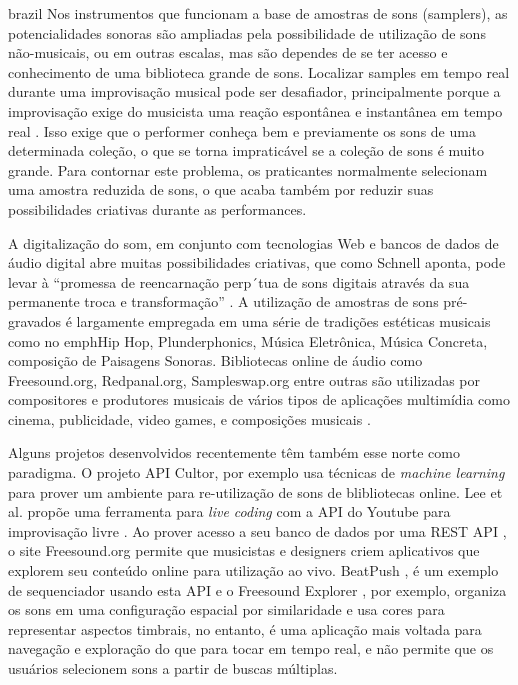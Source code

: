 \begin{otherlanguage*}{brazil}
Nos instrumentos que funcionam a base de amostras de sons (samplers), as potencialidades sonoras são ampliadas pela possibilidade de utilização de sons não-musicais, ou em outras escalas, mas são dependes de se ter acesso e conhecimento de uma biblioteca grande de sons. Localizar samples em tempo real durante uma improvisação musical pode ser desafiador\cite{Xambo2018}, principalmente porque a improvisação exige do musicista uma reação espontânea e instantânea em tempo real \cite{canonne2011model}. Isso exige que o performer conheça bem e previamente os sons de uma determinada coleção, o que se torna impraticável se a coleção de sons é muito grande. Para contornar este problema, os praticantes normalmente selecionam uma amostra reduzida de sons, o que acaba também por reduzir suas possibilidades criativas durante as performances.

A digitalização do som, em conjunto com tecnologias Web e bancos de dados de áudio digital abre muitas possibilidades criativas, que como Schnell aponta, pode levar à ``promessa de reencarnação perp´tua de sons digitais através da sua permanente troca e transformação'' \cite{Schnell2013}. A utilização de amostras de sons pré-gravados é largamente empregada em uma série de tradições estéticas musicais como no emph{Hip Hop, Plunderphonics, Música Eletrônica, Música Concreta, composição de Paisagens Sonoras}. Bibliotecas online de áudio como Freesound.org, Redpanal.org, Sampleswap.org entre outras são utilizadas por compositores e produtores musicais de vários tipos de aplicações multimídia como cinema, publicidade, video games, e composições musicais \cite{Roma2013}. 

Alguns projetos desenvolvidos recentemente têm também esse norte como paradigma. O projeto API Cultor, por exemplo \cite{Ordiales2017} usa técnicas de \emph{machine learning} para prover um ambiente para re-utilização de sons de blibliotecas online. Lee et al. propõe uma ferramenta para \emph{live coding} com a API do Youtube para improvisação livre \cite{Lee}. Ao prover acesso a seu banco de dados por uma REST API \cite{Akkermans2011}, o site Freesound.org permite que musicistas e designers criem aplicativos que explorem seu conteúdo online para utilização ao vivo. BeatPush \cite{Feenstra2016}, é um exemplo de sequenciador usando esta API e o Freesound Explorer \cite{Font2016}, por exemplo, organiza os sons em uma configuração espacial por similaridade e usa cores para representar aspectos timbrais, no entanto, é uma aplicação mais voltada para navegação e exploração do que para tocar em tempo real, e não permite que os usuários selecionem sons a partir de buscas múltiplas. 



\end{otherlanguage*}
